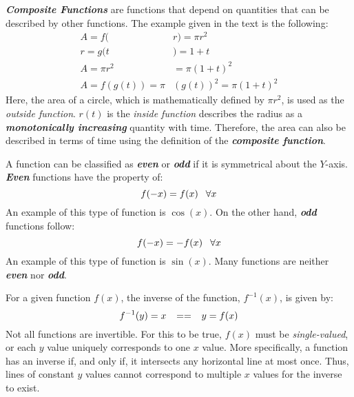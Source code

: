 \vspace{0.1in}
\textbf{\textit{Composite Functions}} are functions that depend on quantities that can be described by other functions. The example given in the text is the following:
\begin{align}
\nonumber
A = f(&r) = \pi r^2\\
\nonumber
r = g(t&) = 1+t\\
\nonumber
 A = \pi r^2 &= \pi \left(1 + t\right)^2\\
\nonumber
A = f\left(g\left(t\right)\right) = \pi &\left(g\left(t\right)\right)^2 = \pi \left(1 + t\right)^2
\end{align}
Here, the area of a circle, which is mathematically defined by $\pi r^2$, is used as the \textit{outside function}. $r\left(t\right)$ is the \textit{inside function} describes the radius as a \textbf{\textit{monotonically increasing}} quantity with time. Therefore, the area can also be described in terms of time using the definition of the \textbf{\textit{composite function}}.

\vspace{0.1in}
A function can be classified as \textbf{\textit{even}} or \textbf{\textit{odd}} if it is symmetrical about the $Y$-axis. \textbf{\textit{Even}} functions have the property of:
\begin{equation}
f(-x) = f(x)\hphantom{-} \forall x
\end{equation}
An example of this type of function is $\cos\left(x\right)$. On the other hand, \textbf{\textit{odd}} functions follow:
\begin{equation}
f(-x) =- f(x)\hphantom{-} \forall x
\end{equation}
An example of this type of function is  $\sin\left(x\right)$. Many functions are neither \textbf{\textit{even}} nor \textbf{\textit{odd}}.

\vspace{0.1in}
For a given function $f(x)$, the inverse of the function, $f^{-1}(x)$, is given by:
\begin{equation}
f^{-1}(y) = x\hphantom{-} ==\hphantom{-} y = f(x)
\end{equation}
Not all functions are invertible. For this to be true, $f(x)$ must be \textit{single-valued}, or each $y$ value uniquely corresponds to one $x$ value. More specifically, a function has an inverse if, and only if, it intersects any horizontal line at most once. Thus, lines of constant $y$ values cannot correspond to multiple $x$ values for the inverse to exist.

